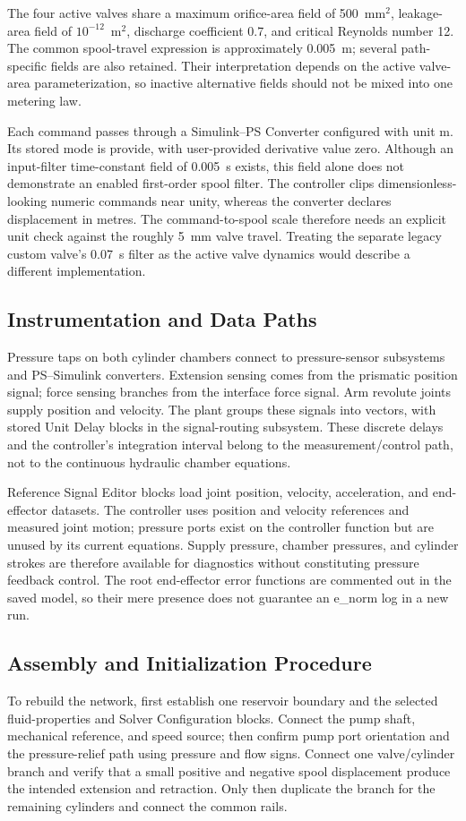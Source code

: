 The four active valves share a maximum orifice-area field of 500~mm$^2$, leakage-area field of $10^{-12}$~m$^2$, discharge coefficient 0.7, and critical Reynolds number 12. The common spool-travel expression is approximately 0.005~m; several path-specific fields are also retained. Their interpretation depends on the active valve-area parameterization, so inactive alternative fields should not be mixed into one metering law.

Each command passes through a Simulink--PS Converter configured with unit m. Its stored mode is \textnormal{provide}, with user-provided derivative value zero. Although an input-filter time-constant field of 0.005~s exists, this field alone does not demonstrate an enabled first-order spool filter. The controller clips dimensionless-looking numeric commands near unity, whereas the converter declares displacement in metres. The command-to-spool scale therefore needs an explicit unit check against the roughly 5~mm valve travel. Treating the separate legacy custom valve's 0.07~s filter as the active valve dynamics would describe a different implementation.

\subsection{Instrumentation and Data Paths}
Pressure taps on both cylinder chambers connect to pressure-sensor subsystems and PS--Simulink converters. Extension sensing comes from the prismatic position signal; force sensing branches from the interface force signal. Arm revolute joints supply position and velocity. The plant groups these signals into vectors, with stored Unit Delay blocks in the signal-routing subsystem. These discrete delays and the controller's integration interval belong to the measurement/control path, not to the continuous hydraulic chamber equations.

Reference Signal Editor blocks load joint position, velocity, acceleration, and end-effector datasets. The controller uses position and velocity references and measured joint motion; pressure ports exist on the controller function but are unused by its current equations. Supply pressure, chamber pressures, and cylinder strokes are therefore available for diagnostics without constituting pressure feedback control. The root end-effector error functions are commented out in the saved model, so their mere presence does not guarantee an \textnormal{e\_norm} log in a new run.

\subsection{Assembly and Initialization Procedure}
To rebuild the network, first establish one reservoir boundary and the selected fluid-properties and Solver Configuration blocks. Connect the pump shaft, mechanical reference, and speed source; then confirm pump port orientation and the pressure-relief path using pressure and flow signs. Connect one valve/cylinder branch and verify that a small positive and negative spool displacement produce the intended extension and retraction. Only then duplicate the branch for the remaining cylinders and connect the common rails.

